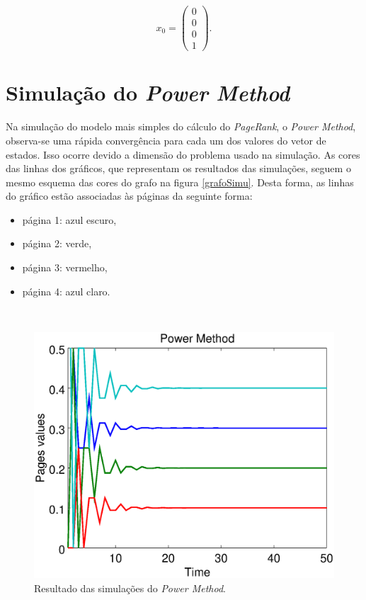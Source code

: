 \begin{equation}\label{x0}
x_0 = \begin{pmatrix}
0\\ 0\\ 0\\ 1
\end{pmatrix}.
\end{equation}

\section{Simulação do \textit{Power Method}}%

Na simulação do modelo mais simples do cálculo do \textit{PageRank}, o \textit{Power Method}, observa-se uma rápida convergência para cada um dos valores do vetor de estados. Isso ocorre devido a dimensão do problema usado na simulação. As cores das linhas dos gráficos, que representam os resultados das simulações, seguem o mesmo esquema das cores do grafo na figura \ref{grafoSimu}. Desta forma, as linhas do gráfico estão associadas às páginas da seguinte forma: 

\begin{itemize}
\item página 1: azul escuro,
\item página 2: verde,
\item página 3: vermelho,
\item página 4: azul claro.
\end{itemize}

\
\begin{figure}[!htb]
	\centering
	\includegraphics[scale=0.4]{imagens/powermethod}
	\caption{Resultado das simulações do \textit{Power Method}.}
	\label{powermethod}
\end{figure}

